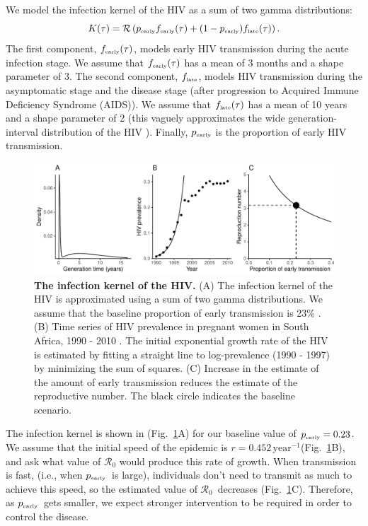 \documentclass[12pt]{article}
\newcommand{\Rx}[1]{\ensuremath{{\mathcal R}_{#1}}}
\newcommand{\Ro}{\Rx{0}}
\newcommand{\tsub}[2]{#1_{{\textrm{\tiny #2}}}}
\newcommand{\pEarly}{\ensuremath{\tsub{p}{early}}}
\newcommand{\figref}[1]{Fig.~\ref{fig:#1}}
\newcommand{\figlab}[1]{\label{fig:#1}}
\begin{document}
We model the infection kernel of the HIV as a sum of two gamma distributions:
\begin{equation}
K(\tau) = \mathcal R \left(\tsub{p}{early} \tsub{f}{early}(\tau) + (1-\tsub{p}{early}) \tsub{f}{late}(\tau) \right).
\end{equation}
The first component, $\tsub{f}{early}(\tau)$, models early HIV transmission during the acute infection stage.
We assume that $\tsub{f}{early}(\tau)$ has a mean of 3 months \citep{hollingsworth2008hiv} and a shape parameter of 3.
The second component, $\tsub{f}{late}$, models HIV transmission during the asymptomatic stage and the disease stage (after progression to Acquired Immune Deficiency Syndrome (AIDS)).
We assume that $\tsub{f}{late}(\tau)$ has a mean of 10 years \citep{brookmeyer1989censoring, nishiura2019estimating} and a shape parameter of 2 (this vaguely approximates the wide generation-interval distribution of the HIV \citep{fraser2004factors}).
Finally, $\tsub{p}{early}$ is the proportion of early HIV transmission.

\begin{figure}[!th]
\includegraphics[width=\textwidth]{../figure/HIV.pdf}
\caption{
\textbf{The infection kernel of the HIV.}
(A) The infection kernel of the HIV is approximated using a sum of two gamma distributions. We assume that the baseline proportion of early transmission is 23\% \citep{hayes2006amplified}.
(B) Time series of HIV prevalence in pregnant women in South Africa, 1990 - 2010 \citep{barron2013eliminating}. The initial exponential growth rate of the HIV is estimated by fitting a straight line to log-prevalence (1990 - 1997) by minimizing the sum of squares.
(C) Increase in the estimate of the amount of early transmission reduces the estimate of the reproductive number.
The black circle indicates the baseline scenario.
}
\figlab{example}
\end{figure}

The infection kernel is shown in (\figref{example}A) for our baseline value of  
$\tsub{p}{early} = 0.23$.  We assume that the initial speed of the epidemic is $r=0.452\,\mathrm{year}^{-1}$(\figref{example}B), and ask what value of $\Ro$ would produce this rate of growth.
When transmission is fast, (i.e., when \pEarly\ is large), individuals don't need to transmit as much to achieve this speed, so the estimated value of \Ro\ decreases (\figref{example}C).
Therefore, as \pEarly\ gets smaller, we expect stronger intervention to be required in order to control the disease.
\end{document}

